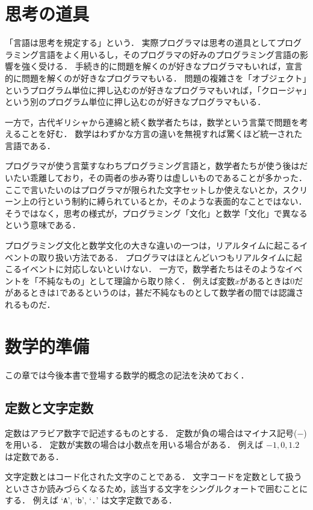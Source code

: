 \documentclass[twocolumn]{jsbook}
\newcommand{\charlit}[1]{\texttt{#1}}
\begin{document}
\chapter{思考の道具}

「言語は思考を規定する」という．
実際プログラマは思考の道具としてプログラミング言語をよく用いるし，そのプログラマの好みのプログラミング言語の影響を強く受ける．
手続き的に問題を解くのが好きなプログラマもいれば，宣言的に問題を解くのが好きなプログラマもいる．
問題の複雑さを「オブジェクト」というプログラム単位に押し込むのが好きなプログラマもいれば，「クロージャ」という別のプログラム単位に押し込むのが好きなプログラマもいる．

一方で，古代ギリシャから連綿と続く数学者たちは，数学という言葉で問題を考えることを好む．
数学はわずかな方言の違いを無視すれば驚くほど統一された言語である．

プログラマが使う言葉すなわちプログラミング言語と，数学者たちが使う後はだいたい乖離しており，その両者の歩み寄りは虚しいものであることが多かった．
ここで言いたいのはプログラマが限られた文字セットしか使えないとか，スクリーン上の行という制約に縛られているとか，そのような表面的なことではない．
そうではなく，思考の様式が，プログラミング「文化」と数学「文化」で異なるという意味である．

プログラミング文化と数学文化の大きな違いの一つは，リアルタイムに起こるイベントの取り扱い方法である．
プログラマはほとんどいつもリアルタイムに起こるイベントに対応しないといけない．
一方で，数学者たちはそのようなイベントを「不純なもの」として理論から取り除く．
例えば変数$x$があるときは0だがあるときは1であるというのは，甚だ不純なものとして数学者の間では認識されるものだ．

\chapter{数学的準備}

この章では今後本書で登場する数学的概念の記法を決めておく．

\section{定数と文字定数}

定数はアラビア数字で記述するものとする．
定数が負の場合はマイナス記号($-$)を用いる．
定数が実数の場合は小数点を用いる場合がある．
例えば $-1, 0, 1.2$ は定数である．

文字定数とはコード化された文字のことである．
文字コードを定数として扱うといささか読みづらくなるため，該当する文字をシングルクォートで囲むことにする．
例えば `\charlit{A}', `\charlit{b}', `\charlit{.}' は文字定数である．
\end{document}
